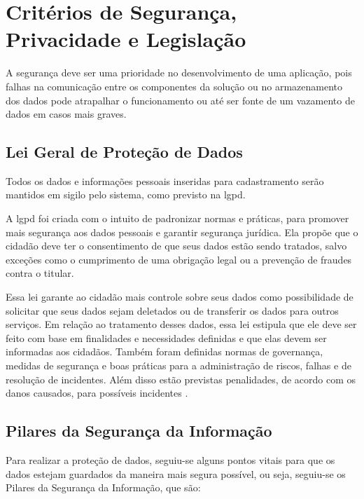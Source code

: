 \section {Critérios de Segurança, Privacidade e Legislação}
A segurança deve ser uma prioridade no desenvolvimento de uma aplicação, pois falhas na comunicação entre os componentes da solução ou no armazenamento dos dados pode atrapalhar o funcionamento ou até ser fonte de um vazamento de dados em casos mais graves. 

\subsection{Lei Geral de Proteção de Dados}
Todos os dados e informações pessoais inseridas para cadastramento serão mantidos em sigilo pelo sistema, como previsto na \ac{lgpd}.

A \ac{lgpd} foi criada com o intuito de padronizar normas e práticas, para promover mais segurança aos dados pessoais e garantir segurança jurídica. Ela propõe que o cidadão deve ter o consentimento de que seus dados estão sendo tratados, salvo exceções como o cumprimento de uma obrigação legal ou a prevenção de fraudes contra o titular.

Essa lei garante ao cidadão mais controle sobre seus dados como possibilidade de solicitar que seus dados sejam deletados ou de transferir os dados para outros serviços. Em relação ao tratamento desses dados, essa lei estipula que ele deve ser feito com base em finalidades e necessidades definidas e que elas devem ser informadas aos cidadãos. Também foram definidas normas de governança, medidas de segurança e boas práticas para a administração de riscos, falhas e de resolução de incidentes. Além disso estão previstas penalidades, de acordo com os danos causados, para possíveis incidentes \cite{lgpd-serpro:2018}.

\subsection {Pilares da Segurança da Informação}
Para realizar a proteção de dados, seguiu-se alguns pontos vitais para que os dados estejam guardados da maneira mais segura possível, ou seja, seguiu-se os Pilares da Segurança da Informação, que são:

